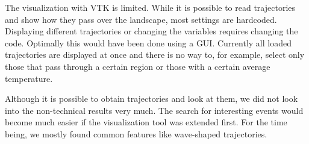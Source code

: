 The visualization with VTK is limited. While it is possible to read trajectories and show how they pass over the landscape, most settings are hardcoded. Displaying different trajectories or changing the variables requires changing the code. Optimally this would have been done using a GUI. Currently all loaded trajectories are displayed at once and there is no way to, for example, select only those that pass through a certain region or those with a certain average temperature.

Although it is possible to obtain trajectories and look at them, we did not look into the non-technical results very much. The search for interesting events would become much easier if the visualization tool was extended first. For the time being, we mostly found common features like wave-shaped trajectories.











